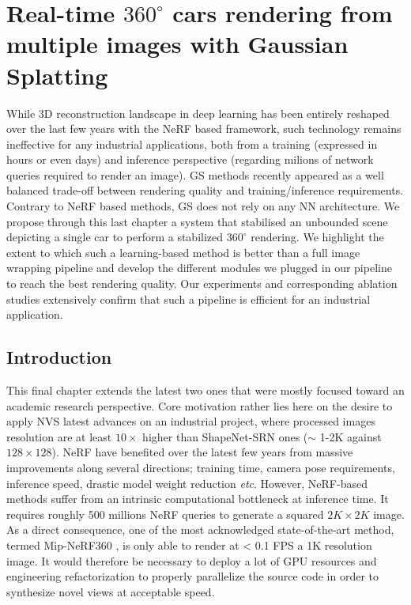 \chapter{Real-time $360 ^{\circ} $ cars rendering from multiple images with Gaussian Splatting}
\label{chapter:gausssplat}



While 3D reconstruction landscape in deep learning has been entirely reshaped over the last few years with the \ac{NeRF} based framework, such technology remains ineffective for any industrial applications, both from a training (expressed in hours or even days) and inference perspective (regarding milions of network queries required to render an image). \ac{GS} methods recently appeared as a well balanced trade-off between rendering quality and training/inference requirements. Contrary to \ac{NeRF} based methods, \ac{GS} does not rely on any \ac{NN} architecture. We propose through this last chapter a system that stabilised an unbounded scene depicting a single car to perform a stabilized $360 ^{\circ} $ rendering. We highlight the extent to which such a learning-based method is better than a full image wrapping pipeline and develop the different modules we plugged in our pipeline to reach the best rendering quality. Our experiments and corresponding ablation studies extensively confirm that such a pipeline is efficient for an industrial application. 

\section{Introduction}
This final chapter extends the latest two ones that were mostly focused toward an academic research perspective. Core motivation rather lies here on the desire to apply \ac{NVS} latest advances on an industrial project, where processed images resolution are at least $10\times$ higher than ShapeNet-SRN \citep{chang2015shapenet,sitzmann2019scene} ones ($\sim$ 1-2K against $128\times128$). \ac{NeRF} have benefited over the latest few years from massive improvements along several directions; training time, camera pose requirements, inference speed, drastic model weight reduction \textit{etc}. 
However, \ac{NeRF}-based methods suffer from an intrinsic computational bottleneck at inference time. It requires roughly 500 millions \ac{NeRF} queries to generate a squared $2K\times2K$ image. As a direct consequence, one of the most acknowledged state-of-the-art method, termed Mip-NeRF360 \citep{barron2022mip}, is only able to render at < 0.1 \ac{FPS} a 1K resolution image. It would therefore be necessary to deploy a lot of \ac{GPU} resources and engineering refactorization to properly parallelize the source code in order to synthesize novel views at acceptable speed. 

